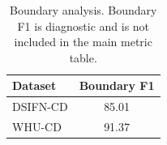 \begin{table}[t]
\centering
\caption{Boundary analysis. Boundary F1 is diagnostic and is not included in the main metric table.}
\label{tab:boundary}
\begin{tabular}{lc}
\toprule
Dataset & Boundary F1 \\
\midrule
DSIFN-CD & 85.01 \\
WHU-CD & 91.37 \\
\bottomrule
\end{tabular}
\end{table}
